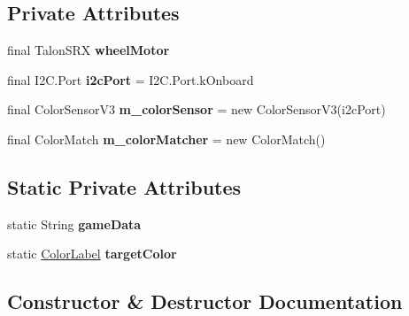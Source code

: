 \subsection*{Private Attributes}
\begin{DoxyCompactItemize}
\item 
\mbox{\label{classfrc_1_1robot_1_1subsystems_1_1_wheel_ab96fda6ef202c585b8ef527f736dff4e}} 
final Talon\+S\+RX {\bfseries wheel\+Motor}
\item 
\mbox{\label{classfrc_1_1robot_1_1subsystems_1_1_wheel_aa6f6bb3b16a45bbd56aa27757d161b6a}} 
final I2\+C.\+Port {\bfseries i2c\+Port} = I2\+C.\+Port.\+k\+Onboard
\item 
\mbox{\label{classfrc_1_1robot_1_1subsystems_1_1_wheel_af7b9889f44ce1d4ef65dca64cdb62acb}} 
final Color\+Sensor\+V3 {\bfseries m\+\_\+color\+Sensor} = new Color\+Sensor\+V3(i2c\+Port)
\item 
\mbox{\label{classfrc_1_1robot_1_1subsystems_1_1_wheel_abf26b63c76921b3e75b33d7d55a2573c}} 
final Color\+Match {\bfseries m\+\_\+color\+Matcher} = new Color\+Match()
\end{DoxyCompactItemize}
\subsection*{Static Private Attributes}
\begin{DoxyCompactItemize}
\item 
\mbox{\label{classfrc_1_1robot_1_1subsystems_1_1_wheel_a1aff5fa24a3cf9282ffd3a9d30c66d06}} 
static String {\bfseries game\+Data}
\item 
\mbox{\label{classfrc_1_1robot_1_1subsystems_1_1_wheel_a3812ba5e512f0110fb3cff4f021a968c}} 
static \mbox{\hyperlink{enumfrc_1_1robot_1_1enums_1_1_color_label}{Color\+Label}} {\bfseries target\+Color}
\end{DoxyCompactItemize}


\subsection{Constructor \& Destructor Documentation}
\mbox{\label{classfrc_1_1robot_1_1subsystems_1_1_wheel_aadbb9a7450a3784b988393b5a74f55f2}} 
